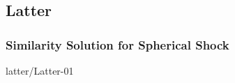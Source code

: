 % 

\subsection{Latter}


\begin{frame}\frametitle{Similarity Solution for Spherical Shock}
\center
	\begin{overpic}[ scale = 0.45 ]
		{\pLocalGraphics latter/Latter-01}
	\end{overpic}
	\ \\
\end{frame}

\endinput  %
